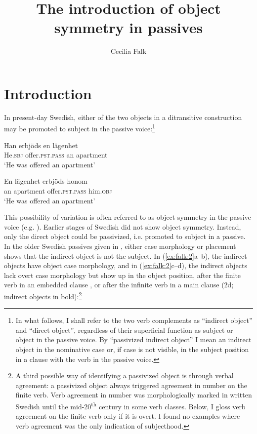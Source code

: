 \documentclass[output=paper]{langscibook}
\author{Cecilia Falk\affiliation{Stockholm University}}
\title{The introduction of object symmetry in passives}
\begin{document}
\maketitle


\section{Introduction}


In present-day Swedish, either of the two objects in a ditransitive construction may be promoted to subject in the passive voice:\footnote{In what follows, I shall refer to the two verb complements as “indirect object” and “direct object”, regardless of their superficial function as subject or object in the passive voice. By “passivized indirect object” I mean an indirect object in the nominative case or, if case is not visible, in the subject position in a clause with the verb in the passive voice.}

\ea%
    \label{ex:falk:1}
\ea
\gll Han    erbjöds      en  lägenhet\\
      He.\textsc{sbj}  offer.\textsc{pst}.\textsc{pass}  an  apartment\\
\glt ‘He was offered an apartment’

\ex
\gll En    lägenhet      erbjöds      honom\\
      an    apartment    offer.\textsc{pst}.\textsc{pass} him.\textsc{obj}\\
\glt ‘He was offered an apartment’
\z
\z


This possibility of variation is often referred to as object symmetry in the passive voice (e.g. \citealt{Anagnostopoulou2003}). Earlier stages of Swedish did not show object symmetry. Instead, only the direct object could be passivized, i.e. promoted to subject in a passive. In the older Swedish passives given in , either case morphology or placement shows that the indirect object is not the subject. In (\ref{ex:falk:2}a–b), the indirect objects have object case morphology, and in (\ref{ex:falk:2}c–d), the indirect objects lack overt case morphology but show up in the object position, after the finite verb in an embedded clause , or after the infinite verb in a main clause (2d; indirect objects in bold):\footnote{A third possible way of identifying a passivized object is through verbal agreement: a passivized object always triggered agreement in number on the finite verb. Verb agreement in number was morphologically marked in written Swedish until the mid-20\textsuperscript{th} century in some verb classes. Below, I gloss verb agreement on the finite verb only if it is overt. I found no examples where verb agreement was the only indication of subjecthood.}
\end{document}
